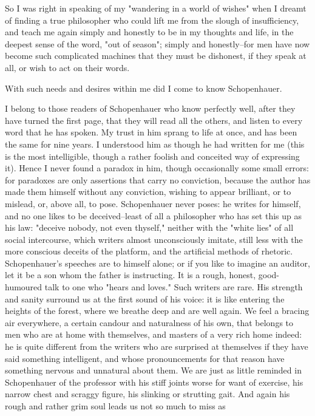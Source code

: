 So I was right in speaking of my "wandering in a world of wishes"
when I dreamt of finding a true philosopher who could lift me from
the slough of insufficiency, and teach me again simply and honestly
to be in my thoughts and life, in the deepest sense of the word, "out
of season"; simply and honestly--for men have now become such
complicated machines that they must be dishonest, if they speak at
all, or wish to act on their words.

With such needs and desires within me did I come to know
Schopenhauer.

I belong to those readers of Schopenhauer who know perfectly well,
after they have turned the first page, that they will read all the
others, and listen to every word that he has spoken. My trust in him
sprang to life at once, and has been the same for nine years. I
understood him as though he had written for me (this is the most
intelligible, though a rather foolish and conceited way of expressing
it). Hence I never found a paradox in him, though occasionally some
small errors: for paradoxes are only assertions that carry no
conviction, because the author has made them himself without any
conviction, wishing to appear brilliant, or to mislead, or, above
all, to pose. Schopenhauer never poses: he writes for himself, and no
one likes to be deceived--least of all a philosopher who has set this
up as his law: "deceive nobody, not even thyself," neither with the
"white lies" of all social intercourse, which writers almost
unconsciously imitate, still less with the more conscious deceits of
the platform, and the artificial methods of rhetoric. Schopenhauer's
speeches are to himself alone; or if you like to imagine an auditor,
let it be a son whom the father is instructing. It is a rough,
honest, good-humoured talk to one who "hears and loves." Such writers
are rare. His strength and sanity surround us at the first sound of
his voice: it is like entering the heights of the forest, where we
breathe deep and are well again. We feel a bracing air everywhere, a
certain candour and naturalness of his own, that belongs to men who
are at home with themselves, and masters of a very rich home indeed:
he is quite different from the writers who are surprised at
themselves if they have said something intelligent, and whose
pronouncements for that reason have something nervous and unnatural
about them. We are just as little reminded in Schopenhauer of the
professor with his stiff joints worse for want of exercise, his
narrow chest and scraggy figure, his slinking or strutting gait. And
again his rough and rather grim soul leads us not so much to miss as
